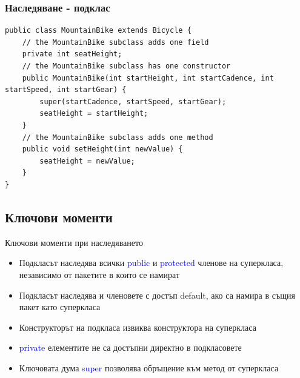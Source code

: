 \documentclass{beamer}
\begin{document}
\begin{frame}[fragile]
  \frametitle{Наследяване - подклас}
  \transdissolve
\begin{lstlisting}[basicstyle=\small]
public class MountainBike extends Bicycle {
    // the MountainBike subclass adds one field
    private int seatHeight;
    // the MountainBike subclass has one constructor
    public MountainBike(int startHeight, int startCadence, int startSpeed, int startGear) {
        super(startCadence, startSpeed, startGear);
        seatHeight = startHeight;
    }		
    // the MountainBike subclass adds one method
    public void setHeight(int newValue) {
        seatHeight = newValue;
    }	
}
\end{lstlisting}
\end{frame}

\subsection{Ключови моменти}
\begin{frame}{Ключови моменти при наследяването}
  \transdissolve
  \begin{itemize}
  \item Подкласът наследява всички \textcolor{blue}{public} и
    \textcolor{blue}{protected} членове на суперкласа, независимо от
    пакетите в които се намират \pause
  \item Подкласът наследява и членовете с достъп default, ако са
    намира в същия пакет като суперкласа \pause
  \item Конструкторът на подкласа извиква конструктора на суперкласа \pause
  \item \textcolor{blue}{private} елементите не са достъпни директно в
    подкласовете \pause
  \item Ключовата дума \textcolor{blue}{super} позволява обръщение към метод от
    суперкласа
  \end{itemize}
\end{frame}
\end{document}
